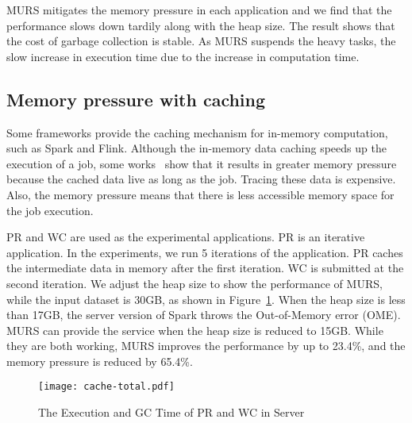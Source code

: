 MURS mitigates the memory pressure in each application and we find that the performance slows down tardily along with the heap size. The result shows that the cost of garbage collection is stable. As MURS suspends the heavy tasks, the slow increase in execution time due to the increase in computation time.  

\begin{comment}
\begin{figure}[!t]
\centering
\texttt{[image: active-task.pdf]}
\vspace{-2mm}
\caption{The minimum active tasks in each server}
\vspace{-6mm}
\label{fig:active-task}
\end{figure}
\end{comment}

\subsection{Memory pressure with caching}

Some frameworks provide the caching mechanism for in-memory computation, such as Spark and Flink. Although the in-memory data caching speeds up the execution of a job, some works~\cite{bu:bloat, nguyen2015facade} show that it results in greater memory pressure because the cached data live as long as the job. Tracing these data is expensive. Also, the memory pressure means that there is less accessible memory space for the job execution.

PR and WC are used as the experimental applications. PR is an iterative application. In the experiments, we run 5 iterations of the application. PR caches the intermediate data in memory after the first iteration. WC is submitted at the second iteration. We adjust the heap size to show the performance of MURS, while the input dataset is 30GB, as shown in Figure~\ref{fig:cache-total}. When the heap size is less than 17GB, the server version of Spark throws the Out-of-Memory error (OME). MURS can provide the service when the heap size is reduced to 15GB. While they are both working, MURS improves the performance by up to 23.4\%, and the memory pressure is reduced by 65.4\%.

\begin{figure}[!t]
\centering
\texttt{[image: cache-total.pdf]}
\vspace{-2mm}
\caption{The Execution and GC Time of PR and WC in Server}
\vspace{-6mm}
\label{fig:cache-total}
\end{figure}

